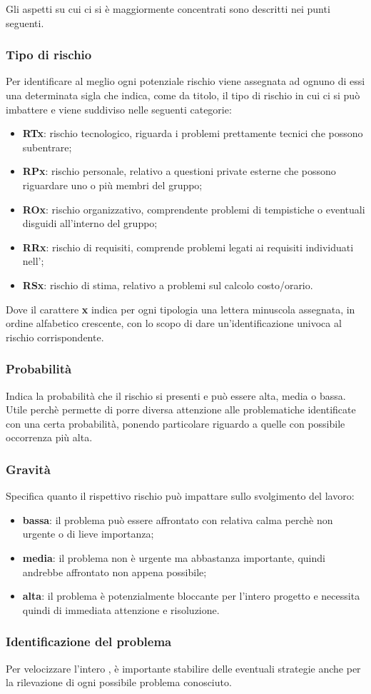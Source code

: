 Gli aspetti su cui ci si è maggiormente concentrati sono descritti nei punti seguenti.

\subsubsection{Tipo di rischio}
    Per identificare al meglio ogni potenziale rischio viene assegnata ad ognuno di essi una determinata sigla che indica, come da titolo, il tipo di rischio in cui ci si può imbattere e viene suddiviso nelle seguenti categorie:
    \begin{itemize}
        \item \textbf{RTx}: rischio tecnologico, riguarda i problemi prettamente tecnici che possono subentrare;
        \item \textbf{RPx}: rischio personale, relativo a questioni private esterne che possono riguardare uno o più membri del gruppo;
        \item \textbf{ROx}: rischio organizzativo, comprendente problemi di tempistiche o eventuali disguidi all'interno del gruppo;
        \item \textbf{RRx}: rischio di requisiti, comprende problemi legati ai requisiti individuati nell'\AdR{};
        \item \textbf{RSx}: rischio di stima, relativo a problemi sul calcolo costo/orario.
    \end{itemize}
    Dove il carattere \textbf{x} indica per ogni tipologia una lettera minuscola assegnata, in ordine alfabetico crescente, con lo scopo di dare un'identificazione univoca al rischio corrispondente.
    
\subsubsection{Probabilità}
    Indica la probabilità che il rischio si presenti e può essere alta, media o bassa. Utile perchè permette di porre diversa attenzione alle problematiche identificate con una certa probabilità, ponendo particolare riguardo a quelle con possibile occorrenza più alta.

\subsubsection{Gravità}
    Specifica quanto il rispettivo rischio può impattare sullo svolgimento del lavoro:
    \begin{itemize}
        \item \textbf{bassa}: il problema può essere affrontato con relativa calma perchè non urgente o di lieve importanza;
        \item \textbf{media}: il problema non è urgente ma abbastanza importante, quindi andrebbe affrontato non appena possibile;
        \item \textbf{alta}: il problema è potenzialmente bloccante per l'intero progetto e necessita quindi di immediata attenzione e risoluzione.
    \end{itemize}
    
\subsubsection{Identificazione del problema}
    Per velocizzare l'intero , è importante stabilire delle eventuali strategie anche per la rilevazione di ogni possibile problema conosciuto.